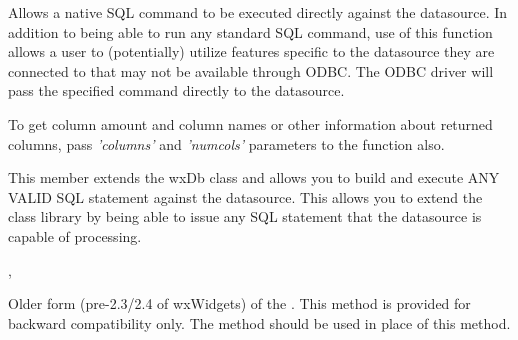 
\label{wxdbexecsql}



Allows a native SQL command to be executed directly against the datasource.  In addition to being able to run any standard SQL command, use of this function allows a user to (potentially) utilize features specific to the datasource they are connected to that may not be available through ODBC.  The ODBC driver will pass the specified command directly to the datasource.

To get column amount and column names or other information about returned columns, pass {\it 'columns'} and {\it 'numcols'} parameters to the function also.






This member extends the wxDb class and allows you to build and execute ANY VALID
SQL statement against the datasource.  This allows you to extend the class
library by being able to issue any SQL statement that the datasource is capable
of processing.


, 

\label{wxdbfwdonlycursors}


Older form (pre-2.3/2.4 of wxWidgets) of the
.  This method is
provided for backward compatibility only.  The method
 should be
used in place of this method.


